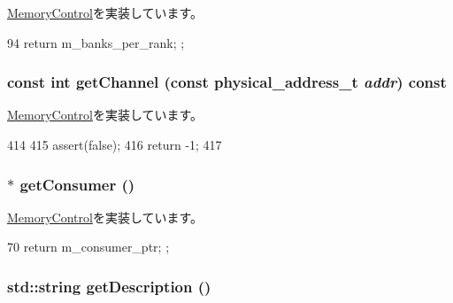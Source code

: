 \hyperlink{classMemoryControl_a931e1da3d57d22fd7f4ba3583697c336}{MemoryControl}を実装しています。


\begin{DoxyCode}
94 { return m_banks_per_rank; };
\end{DoxyCode}
\hypertarget{classRubyMemoryControl_a08f255b8eb3b262916a47fa8f7c12e63}{
\subsubsection[{getChannel}]{\setlength{\rightskip}{0pt plus 5cm}const int getChannel (const {\bf physical\_\-address\_\-t} {\em addr}) const}}
\label{classRubyMemoryControl_a08f255b8eb3b262916a47fa8f7c12e63}


\hyperlink{classMemoryControl_a439a91ae6f587e18a500ba947d0728d5}{MemoryControl}を実装しています。


\begin{DoxyCode}
414 {
415     assert(false);
416     return -1;
417 }
\end{DoxyCode}
\hypertarget{classRubyMemoryControl_a2417fc7252a612b5c976ceaa2d1be4f7}{
\subsubsection[{getConsumer}]{$\ast$ getConsumer ()}}
\label{classRubyMemoryControl_a2417fc7252a612b5c976ceaa2d1be4f7}


\hyperlink{classMemoryControl_acb101bbbf38f858442ec618e9705d039}{MemoryControl}を実装しています。


\begin{DoxyCode}
70 { return m_consumer_ptr; };
\end{DoxyCode}
\hypertarget{classRubyMemoryControl_a73da75c3e5ec30855a02eae2ba824e38}{
\subsubsection[{getDescription}]{\setlength{\rightskip}{0pt plus 5cm}std::string getDescription ()}}
\label{classRubyMemoryControl_a73da75c3e5ec30855a02eae2ba824e38}


